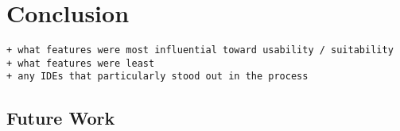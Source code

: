 \section{Conclusion}
\label{sec:conclusion}

\begin{verbatim}
+ what features were most influential toward usability / suitability
+ what features were least
+ any IDEs that particularly stood out in the process
\end{verbatim}



\subsection{Future Work}
\label{subsec:future_work}
